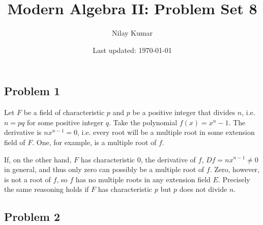 \documentclass{../../mathnotes}
\title{Modern Algebra II: Problem Set 8}
\author{Nilay Kumar}
\date{Last updated: \today}
\begin{document}
\maketitle

\subsection*{Problem 1}

Let $F$ be a field of characteristic $p$ and $p$ be a positive integer that divides $n$, i.e. $n=pq$ for some positive integer $q$.
Take the polynomial $f(x)=x^n-1$. The derivative is $nx^{n-1}=0$, i.e. every root will be a multiple root in some extension field of $F$.
One, for example, is a multiple root of $f$.

If, on the other hand, $F$ has characteristic 0, the derivative of $f$, $Df=nx^{n-1}\neq 0$ in general, and thus only zero can possibly
be a multiple root of $f$. Zero, however, is not a root of $f$, so $f$ has no multiple roots in any extension field $E$. Precisely
the same reasoning holds if $F$ has characteristic $p$ but $p$ does not divide $n$.

\subsection*{Problem 2}
\end{document}
